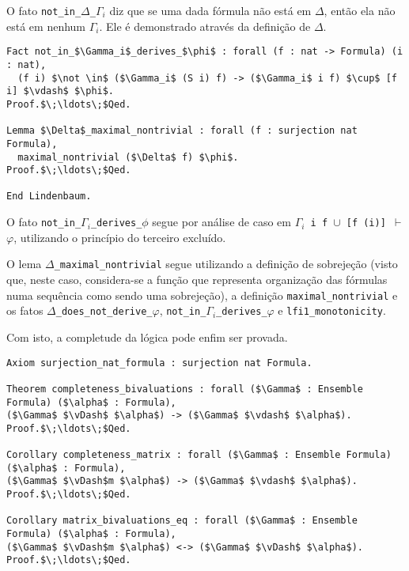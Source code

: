         O fato \texttt{not\_in\_$\Delta$\_$\Gamma_i$} diz que se uma dada fórmula não está em $\Delta$, então ela não está em nenhum $\Gamma_i$. Ele é demonstrado através da definição de $\Delta$.
        
        \begin{lstlisting}[name=Completeness, frame=single, language=coq]
Fact not_in_$\Gamma_i$_derives_$\phi$ : forall (f : nat -> Formula) (i : nat),
  (f i) $\not \in$ ($\Gamma_i$ (S i) f) -> ($\Gamma_i$ i f) $\cup$ [f i] $\vdash$ $\phi$.
Proof.$\;\ldots\;$Qed.

Lemma $\Delta$_maximal_nontrivial : forall (f : surjection nat Formula),
  maximal_nontrivial ($\Delta$ f) $\phi$.
Proof.$\;\ldots\;$Qed.

End Lindenbaum.
        \end{lstlisting}

        O fato \texttt{not\_in\_$\Gamma_i$\_derives\_$\phi$} segue por análise de caso em \texttt{$\Gamma_i$\ i\ f $\cup$ [f (i)] $\vdash$ $\varphi$}, utilizando o princípio do terceiro excluído.
        
        O lema \texttt{$\Delta$\_maximal\_nontrivial} segue utilizando a definição de sobrejeção (visto que, neste caso, considera-se a função que representa organização das fórmulas numa sequência como sendo uma sobrejeção), a definição \texttt{maximal\_nontrivial} e os fatos \texttt{$\Delta$\_does\_not\_derive\_$\varphi$}, \texttt{not\_in\_$\Gamma_i$\_derives\_$\varphi$} e \texttt{lfi1\_monotonicity}.

        Com isto, a completude da lógica \lfium{} pode enfim ser provada.

        \begin{lstlisting}[name=Completeness, frame=single, language=coq]
Axiom surjection_nat_formula : surjection nat Formula.

Theorem completeness_bivaluations : forall ($\Gamma$ : Ensemble Formula) ($\alpha$ : Formula), 
($\Gamma$ $\vDash$ $\alpha$) -> ($\Gamma$ $\vdash$ $\alpha$).
Proof.$\;\ldots\;$Qed.
  
Corollary completeness_matrix : forall ($\Gamma$ : Ensemble Formula) ($\alpha$ : Formula), 
($\Gamma$ $\vDash$m $\alpha$) -> ($\Gamma$ $\vdash$ $\alpha$).
Proof.$\;\ldots\;$Qed.

Corollary matrix_bivaluations_eq : forall ($\Gamma$ : Ensemble Formula) ($\alpha$ : Formula),
($\Gamma$ $\vDash$m $\alpha$) <-> ($\Gamma$ $\vDash$ $\alpha$).
Proof.$\;\ldots\;$Qed.
        \end{lstlisting}

